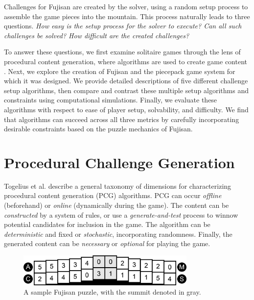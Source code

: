 \documentclass[10pt,journal,compsoc]{IEEEtran}
\begin{document}
Challenges for Fujisan are created by the solver, using a random setup process to assemble the game pieces into the mountain. This process naturally leads to three questions. {\it How easy is the setup process for the solver to execute? Can all such challenges be solved? How difficult are the created challenges? }

To answer these questions, we first examine solitaire games through the lens of procedural content generation, where algorithms are used to create game content \cite{PCGSURVEY}. Next, we explore the creation of Fujisan and the piecepack game system for which it was designed. We provide detailed descriptions of five different challenge setup algorithms, then compare and contrast these multiple setup algorithms and constraints using computational simulations. Finally, we evaluate these algorithms with respect to ease of player setup, solvability, and difficulty. We find that algorithms can succeed across all three metrics by carefully incorporating desirable constraints based on the puzzle mechanics of Fujisan. 


\section{Procedural Challenge Generation}  \label{sec:Background}

\noindent
Togelius et al. \cite{SBPCG} describe a general taxonomy of dimensions for characterizing procedural content generation (PCG) algorithms. PCG can occur {\it offline} (beforehand) or {\it online} (dynamically during the game). The content can be {\it constructed}
by a system of rules, or use a {\it generate-and-test} process to winnow potential candidates for inclusion in the game.
The algorithm can be {\it deterministic} and fixed or {\it stochastic}, incorporating randomness.
Finally, the generated content can be {\it necessary} or {\it optional} for playing the game.

\begin{figure}[b]
\includegraphics[width=8.8cm]{piecepackexample.png}
\caption{A sample Fujisan puzzle, with the summit denoted in gray.}
\label{fig:SampleFujisan}
\end{figure}
\end{document}
